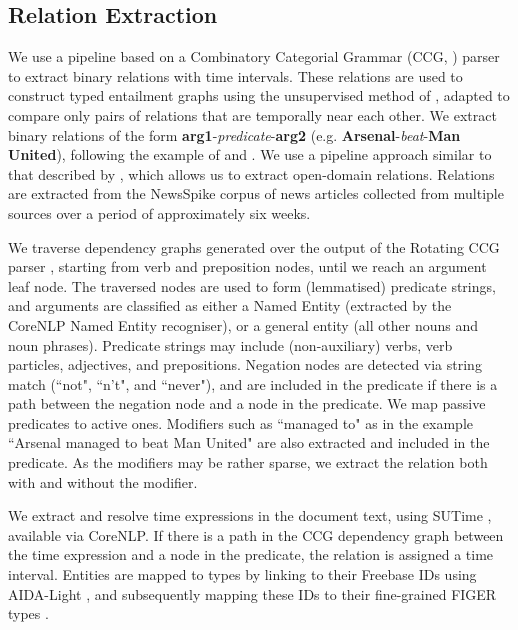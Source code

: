 \documentclass[11pt]{article}
\begin{document}
\subsection{Relation Extraction}
\label{subsec:relation_extraction}
We use a pipeline based on a Combinatory Categorial Grammar (CCG, \cite{Steedman2000}) parser to extract binary relations with time intervals. These relations are used to construct typed entailment graphs using the unsupervised method of , adapted to compare only pairs of relations that are temporally near each other. We extract binary relations of the form \textbf{arg1}-\textit{predicate}-\textbf{arg2} (e.g. \textbf{Arsenal}-\textit{beat}-\textbf{Man United}), following the example of  and . We use a pipeline approach similar to that described by , which allows us to extract open-domain relations. Relations are extracted from the NewsSpike corpus \cite{zhang2013} of news articles collected from multiple sources over a period of approximately six weeks.

We traverse dependency graphs generated over the output of the Rotating CCG parser \cite{stanojevic2019}, starting from verb and preposition nodes, until we reach an argument leaf node. The traversed nodes are used to form (lemmatised) predicate strings, and arguments are classified as either a Named Entity (extracted by the CoreNLP Named Entity recogniser), or a general entity (all other nouns and noun phrases). Predicate strings may include (non-auxiliary) verbs, verb particles, adjectives, and prepositions. Negation nodes are detected via string match (``not", ``n't", and ``never"), and are included in the predicate if there is a path between the negation node and a node in the predicate. We map passive predicates to active ones. Modifiers such as ``managed to" as in the example ``Arsenal managed to beat Man United" are also extracted and included in the predicate. As the modifiers may be rather sparse, we extract the relation both with and without the modifier.

We extract and resolve time expressions in the document text, using SUTime \cite{chang2012}, available via CoreNLP. If there is a path in the CCG dependency graph between the time expression and a node in the predicate, the relation is assigned a time interval. Entities are mapped to types by linking to their Freebase \cite{bollacker2008} IDs using AIDA-Light \cite{nguyen2014}, and subsequently mapping these IDs to their fine-grained FIGER types \cite{ling2012}.
\end{document}

